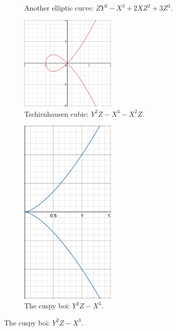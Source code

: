 \documentclass[12pt]{article}
\theoremstyle{definition}
\begin{document}
\begin{figure}[H]
\begin{subfigure}{0.5\textwidth}
        \caption{Another elliptic curve: $ZY^2-X^3+2XZ^2+3Z^3$.}
        \label{fig:subim2}
    \end{subfigure}
    \vspace{1 cm}
    \begin{subfigure}{0.5\textwidth}
        \centering
        \includegraphics[width=0.5\textwidth]{43.png}
        \caption{Tschirnhausen cubic: $Y^2Z-X^3-X^2Z$.}
        \label{fig:subim2}
    \end{subfigure}
    \hfill
    \begin{subfigure}{0.5\textwidth}
        \centering
        \includegraphics[width=0.5\textwidth]{46.png}
        \caption{The cuspy boi: $Y^2Z-X^3$.}
        \label{fig:subim2}
    \end{subfigure}

\end{figure}
\end{document}
